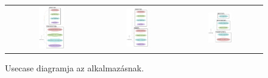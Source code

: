 \begin{figure}[!ht]
\begin{tabular}{ccc}
        \includegraphics[width=0.30\textwidth, height=0.4\textheight]{figures/MultipleChoiceQuestion Diagram.png} & 
        \includegraphics[width=0.30\textwidth, height=0.4\textheight]{figures/Exam Diagram.png} & 
        \includegraphics[width=0.30\textwidth, height=0.4\textheight]{figures/AnswerCheck Diagram.png}
    \end{tabular}
    \caption{Usecase diagramja az alkalmazásnak.}
    \label{fig:UsecaseDiagram}
\end{figure}